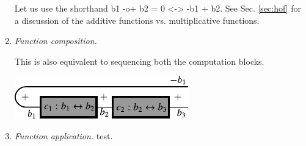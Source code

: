 \documentclass[preprint]{sigplanconf}
\begin{document}
\begin{enumerate}
Let us use the shorthand {{b1 -o+ b2 = 0 <-> -b1 + b2}}. See
Sec. \ref{sec:hof} for a discussion of the additive functions
vs. multiplicative functions.

\item
\emph{Function composition.}

\begin{multicols}{2}

\end{multicols}
This is also equivalent to sequencing both the computation blocks. 

\begin{center}
  \includegraphics{diagrams/compose2.pdf}
\end{center}

\item
\emph{Function application.}
test.
\begin{multicols}{2}
\begin{center}
\end{center}
\begin{center}
\end{center}
\end{multicols}


\end{enumerate}
\end{document}
